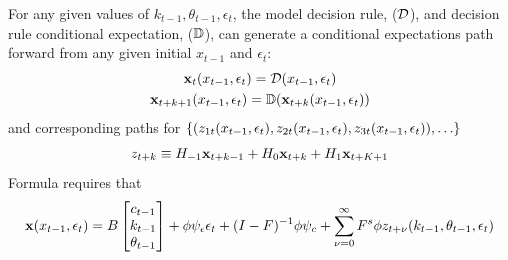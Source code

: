 \documentclass[12pt]{article}
\begin{document}
For any given values of $k_{t-1},\theta_{t-1}, \epsilon_t$, the model decision rule, ($\mathcal{D}$), and decision rule conditional expectation, ($\mathbb{D}$), can generate a conditional expectations path forward from  any given initial $x_{t-1}$ and $\epsilon_t$:
\begin{gather*}
  \mathbf{x}_t({x_{t-1},\epsilon_t})=\mathcal{D}({x_{t-1},\epsilon_t})\\
  \mathbf{x}_{t+k+1}({x_{t-1},\epsilon_t})=\mathbb{D}(\mathbf{x}_{t+k}({x_{t-1},\epsilon_t}))
\end{gather*}
and corresponding paths for $\{(z_{1t}(x_{t-1},\epsilon_t), z_{2t}(x_{t-1},\epsilon_t), z_{3t}(x_{t-1},\epsilon_t)),\ldots\}$
\begin{gather*}
  z_{t+k} \equiv H_{-1} \mathbf{x}_{t+k-1} +  H_0 \mathbf{x}_{t+k} +  H_1 \mathbf{x}_{t+K+1} 
\end{gather*}
Formula  requires that
\begin{gather*}
\mathbf{x}({x_{t-1},\epsilon_t})=
B   \begin{bmatrix}
c_{t-1}\\
k_{t-1}\\
\theta_{t-1}
  \end{bmatrix}  + \phi \psi_\epsilon\epsilon_t + (I - F)^{-1} \phi \psi_c + \sum_{{\nu}=0}^\infty F^s \phi z_{t+{\nu}}(k_{t-1},\theta_{t-1}, \epsilon_t) 
\end{gather*}
\end{document}
